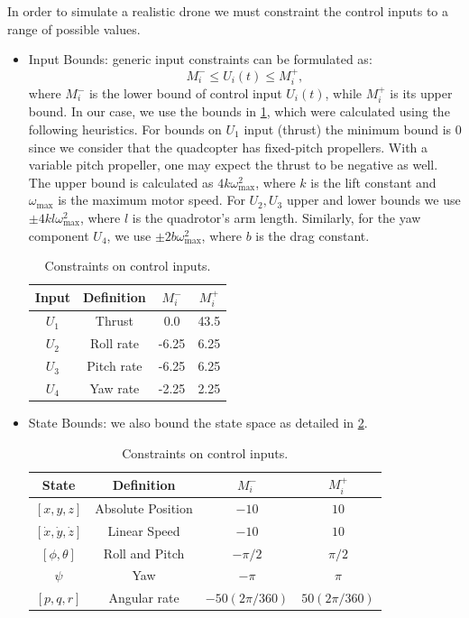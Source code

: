 In order to simulate a realistic drone we must constraint the control inputs to a range of possible values.
\begin{itemize}
  \item Input Bounds: generic input constraints can be formulated as: 
  $$M_{i}^{-} \leq U_{i}(t) \leq M_{i}^{+},$$
  where $M_{i}^{-}$ is the lower bound of control input $U_{i}(t)$, while $M_{i}^{+}$ is its upper bound.
  In our case, we use the bounds in \cref{tab:control_bounds}, which were calculated using the following heuristics.
  For bounds on $U_1$ input (thrust) the minimum bound is $0$ since we consider that the quadcopter has fixed-pitch propellers.
  With a variable pitch propeller, one may expect the thrust to be negative as well.
  The upper bound is calculated as $4 k \omega_{\text{max}}^{2}$, where $k$ is the lift constant and $\omega_{\text{max}}$ is the maximum motor speed.
  For $U_2, U_3$ upper and lower bounds we use $\pm 4 k l \omega_{\text{max}}^{2}$, where $l$ is the quadrotor's arm length.
  Similarly, for the yaw component $U_4$, we use  $\pm 2 b \omega_{\text{max}}^{2}$, where $b$ is the drag constant.
  \begin{table}[htbp]
    \center
    \begin{tabular}{|c|c|c|c|}
      \hline 
      Input & Definition & $M_i^{-}$ & $M_i^{+}$ \\
      \hline 
      {$U_1$} & {Thrust} & 0.0 & 43.5 \\
      {$U_2$} & {Roll rate} & -6.25 & 6.25 \\
      {$U_3$} & {Pitch rate} & -6.25 & 6.25\\
      {$U_4$} & {Yaw rate} & -2.25 & 2.25\\
      \hline
    \end{tabular}
    \caption{Constraints on control inputs.}
    \label{tab:control_bounds}
  \end{table}

  \item State Bounds: we also bound the state space as detailed in \cref{tab:state_bounds}.

  \begin{table}[htbp]
    \center
    \begin{tabular}{|c|c|c|c|}
      \hline 
      State & Definition & $M_i^{-}$ & $M_i^{+}$ \\
      \hline 
      {$[x, y, z]$} & {Absolute Position} & $-10$ & $10$ \\
      {$[\dot{x}, \dot{y}, \dot{z}]$} & {Linear Speed} & $-10$ & $10$ \\
      {$[\phi, \theta]$} & {Roll and Pitch} & $-\pi/2$ & $\pi/2$ \\
      {$\psi$} & {Yaw} & $-\pi$ & $\pi$ \\
      {$[p, q, r]$} & {Angular rate} & $-50(2\pi/360)$ & $50(2\pi/360)$\\
      \hline
    \end{tabular}
    \caption{Constraints on control inputs.}
    \label{tab:state_bounds}
  \end{table}


\end{itemize}
